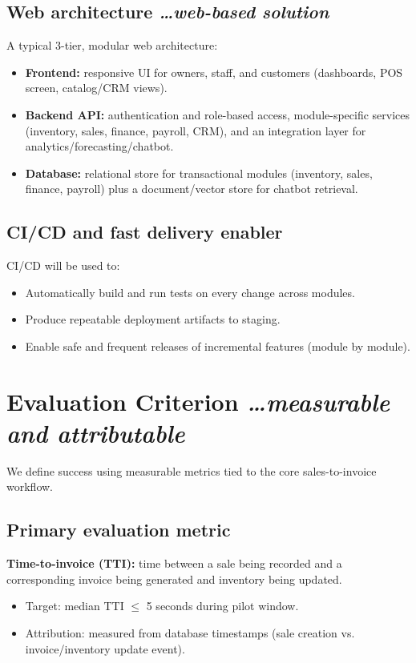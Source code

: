 \documentclass[11pt,a4paper]{article}
\newcommand{\BvrHint}[1]{%
  {\normalfont\normalsize\itshape\hfill #1}}
\begin{document}
\subsection{Web architecture %
\BvrHint{\ldots web-based solution}}
A typical 3-tier, modular web architecture:
\begin{itemize}[leftmargin=0.7cm]
    \item \textbf{Frontend:} responsive UI for owners, staff, and customers (dashboards, POS screen, catalog/CRM views).
    \item \textbf{Backend API:} authentication and role-based access, module-specific services (inventory, sales, finance, payroll, CRM), and an integration layer for analytics/forecasting/chatbot.
    \item \textbf{Database:} relational store for transactional modules (inventory, sales, finance, payroll) plus a document/vector store for chatbot retrieval.
\end{itemize}

\subsection{CI/CD and fast delivery enabler}
CI/CD will be used to:
\begin{itemize}[leftmargin=0.7cm]
    \item Automatically build and run tests on every change across modules.
    \item Produce repeatable deployment artifacts to staging.
    \item Enable safe and frequent releases of incremental features (module by module).
\end{itemize}

\section{Evaluation Criterion %
\BvrHint{\ldots measurable and attributable}}
We define success using measurable metrics tied to the core sales-to-invoice workflow.

\subsection{Primary evaluation metric}
\textbf{Time-to-invoice (TTI):} time between a sale being recorded and a corresponding invoice being generated and inventory being updated.
\begin{itemize}[leftmargin=0.7cm]
    \item Target: median TTI $\le$ 5 seconds during pilot window.
    \item Attribution: measured from database timestamps (sale creation vs. invoice/inventory update event).
\end{itemize}
\end{document}
